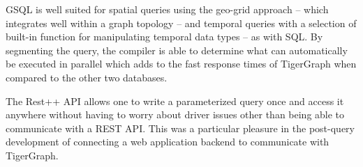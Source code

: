 GSQL is well suited for spatial queries using the geo-grid approach -- which integrates well within a graph topology -- and temporal queries with a selection of built-in function for manipulating temporal data types -- as with SQL. By segmenting the query, the compiler is able to determine what can automatically be executed in parallel which adds to the fast response times of TigerGraph when compared to the other two databases.

The Rest++ API allows one to write a parameterized query once and access it anywhere without having to worry about driver issues other than being able to communicate with a REST API. This was a particular pleasure in the post-query development of connecting a web application backend to communicate with TigerGraph.
